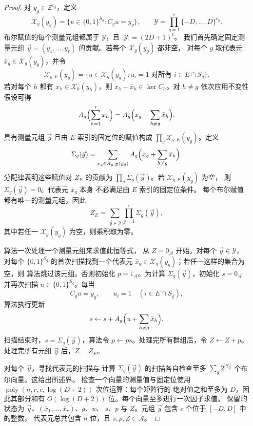 \documentclass[11pt,reqno]{amsart}
\numberwithin{equation}{section}
\theoremstyle{definition}\newtheorem{definition}[theorem]{定义}
\theoremstyle{remark}\newtheorem{remark}[theorem]{注}
\newcommand{\poly}{\operatorname{poly}}
\begin{document}
\begin{proof}
对 $y_g\in\mathbb Z^{c_g}$，定义
\[
 \mathcal X_g(y_g)=\{u\in\{0,1\}^{S_g}:C_gu=y_g\},
 \qquad
 \mathcal Y=\prod_{g=1}^r\{-D,\ldots,D\}^{c_g}.
\]
布尔赋值的每个测量元组都属于
$\mathcal Y$，且 $|\mathcal Y|=(2D+1)^c$。
我们首先确定固定测量元组
$\vec y=(y_1,\ldots,y_r)$ 的贡献。若每个 $\mathcal X_g(y_g)$ 都非空，
对每个 $g$ 取代表元 $\bar x_g\in\mathcal X_g(y_g)$，并令
\[
 \mathcal X_{g,E}(y_g)=
 \{u\in\mathcal X_g(y_g):u_i=1\text{ 对所有 }i\in E\cap S_g\}.
\]
若对每个 $h$ 都有 $x_h\in\mathcal X_h(y_h)$，则
$x_h-\bar x_h\in\ker C_h$。对 $h\ne g$ 依次应用不变性假设可得
\[
 A_g\Bigl(\sum_{h=1}^r x_h\Bigr)
 =A_g\Bigl(x_g+\sum_{h\ne g}\bar x_h\Bigr).
\]
具有测量元组 $\vec y$ 且由
$E$ 索引的固定位的赋值构成 $\prod_g\mathcal X_{g,E}(y_g)$。定义
\begin{equation}\label{eq:group-sum}
 \Sigma_g(\vec y)=\sum_{x_g\in\mathcal X_{g,E}(y_g)}
       A_g\Bigl(x_g+\sum_{h\ne g}\bar x_h\Bigr).
\end{equation}
分配律表明这些赋值对 $Z_E$ 的贡献为
$\prod_g\Sigma_g(\vec y)$。若 $\mathcal X_{g,E}(y_g)$ 为空，
则 $\Sigma_g(\vec y)=0$。代表元 $\bar x_g$ 本身
不必满足由 $E$ 索引的固定位条件。
每个布尔赋值都有唯一的测量元组，因此
\[
 Z_E=\sum_{\vec y\in\mathcal Y}\prod_{g=1}^r\Sigma_g(\vec y),
\]
其中若任一 $\mathcal X_g(y_g)$
为空，则乘积取为零。

算法一次处理一个测量元组来求值此恒等式，
从 $Z=0_{\mathcal A}$ 开始。对每个 $\vec y\in\mathcal Y$，
对每个 $\{0,1\}^{S_g}$ 的首次扫描找到一个代表元
$\bar x_g\in\mathcal X_g(y_g)$；若任一这样的集合为空，则
算法跳过该元组。否则初始化
$p=1_{\mathcal A}$。为计算 $\Sigma_g(\vec y)$，初始化
$s=0_{\mathcal A}$ 并再次扫描 $u\in\{0,1\}^{S_g}$。每当
\[
 C_gu=y_g,\qquad u_i=1\quad(i\in E\cap S_g),
\]
算法执行更新
\[
 s\leftarrow s+A_g\Bigl(u+\sum_{h\ne g}\bar x_h\Bigr).
\]
扫描结束时，$s=\Sigma_g(\vec y)$，算法令
$p\leftarrow ps$。处理完所有群组后，令 $Z\leftarrow Z+p$。
处理完所有元组 $\vec y$ 后，$Z=Z_E$。

对每个 $\vec y$，寻找代表元的扫描与
计算 $\Sigma_g(\vec y)$ 的扫描各自检查至多
$\sum_g2^{|S_g|}$ 个布尔向量。这给出所述界。
检查一个向量的测量值与固定位使用
$\poly(n,r,c,\log(D+2))$ 次位运算：每个矩阵行的
绝对值之和至多为 $D$，因此其部分和有
$O(\log(D+2))$ 位。每个向量至多进行一次因子求值。
保留的状态为 $\vec y$、$(\bar x_1,\ldots,\bar x_r)$、$g$、$u$、
$s$、$p$ 与 $Z$。元组 $\vec y$ 包含 $c$ 个位于 $[-D,D]$ 中的整数，
代表元总共包含 $n$ 位，且 $s,p,Z\in\mathcal A$。
\end{proof}
\end{document}
